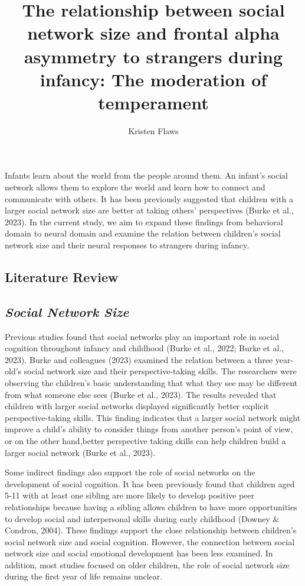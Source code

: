 \documentclass[
  man,
  floatsintext,
  longtable,
  nolmodern,
  notxfonts,
  notimes,
  colorlinks=true,linkcolor=blue,citecolor=blue,urlcolor=blue]{apa7}
\title{The relationship between social network size and frontal alpha
asymmetry to strangers during infancy: The moderation of temperament}
\author{Kristen Flaws}
\affiliation{
{MA Program in the Social Sciences, University of Chicago}}
\begin{document}
\maketitle


\setcounter{secnumdepth}{-\maxdimen} %

\setlength\LTleft{0pt}


Infants learn about the world from the people around them. An infant's
social network allows them to explore the world and learn how to connect
and communicate with others. It has been previously suggested that
children with a larger social network size are better at taking others'
perspectives (Burke et al., 2023). In the current study, we aim to
expand these findings from behavioral domain to neural domain and
examine the relation between children's social network size and their
neural responses to strangers during infancy.

\subsection{Literature Review}\label{literature-review}

\subsection{\texorpdfstring{\emph{Social Network
Size}}{Social Network Size}}\label{social-network-size}

Previous studies found that social networks play an important role in
social cognition throughout infancy and childhood (Burke et al., 2022;
Burke et al., 2023). Burke and colleagues (2023) examined the relation
between a three year-old's social network size and their
perspective-taking skills. The researchers were observing the children's
basic understanding that what they see may be different from what
someone else sees (Burke et al., 2023). The results revealed that
children with larger social networks displayed significantly better
explicit perspective-taking skills. This finding indicates that a larger
social network might improve a child's ability to consider things from
another person's point of view, or on the other hand,better perspective
taking skills can help children build a larger social network (Burke et
al., 2023).

Some indirect findings also support the role of social networks on the
development of social cognition. It has been previously found that
children aged 5-11 with at least one sibling are more likely to develop
positive peer relationships because having a sibling allows children to
have more opportunities to develop social and interpersonal skills
during early childhood (Downey \& Condron, 2004). These findings support
the close relationship between children's social network size and social
cognition. However, the connection between social network size and
social emotional development has been less examined. In addition, most
studies focused on older children, the role of social network size
during the first year of life remains unclear.
\end{document}

